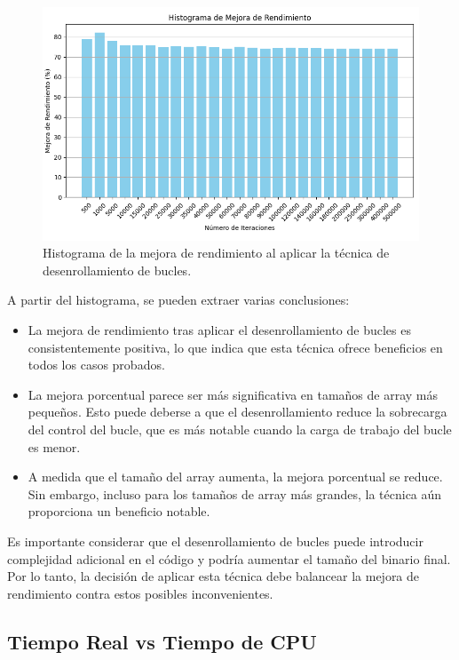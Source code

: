 \documentclass[a4paper,twocolumn]{article}
\begin{document}
\begin{figure}[H]
    \centering
    \includegraphics[width=\columnwidth]{img/improvement.png}
    \caption{Histograma de la mejora de rendimiento al aplicar la técnica de desenrollamiento de bucles.}
    \label{fig:histograma_mejora_rendimiento}
\end{figure}


A partir del histograma, se pueden extraer varias conclusiones:

\begin{itemize}
    \item La mejora de rendimiento tras aplicar el desenrollamiento de bucles es consistentemente positiva, lo que indica que esta técnica ofrece beneficios en todos los casos probados.
    \item La mejora porcentual parece ser más significativa en tamaños de array más pequeños. Esto puede deberse a que el desenrollamiento reduce la sobrecarga del control del bucle, que es más notable cuando la carga de trabajo del bucle es menor.
    \item A medida que el tamaño del array aumenta, la mejora porcentual se reduce. Sin embargo, incluso para los tamaños de array más grandes, la técnica aún proporciona un beneficio notable.
\end{itemize}

Es importante considerar que el desenrollamiento de bucles puede introducir complejidad adicional en el código y podría aumentar el tamaño del binario final. Por lo tanto, la decisión de aplicar esta técnica debe balancear la mejora de rendimiento contra estos posibles inconvenientes.

\subsection{Tiempo Real vs Tiempo de CPU}
\end{document}

